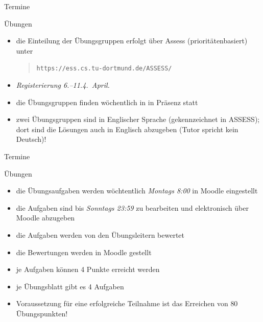 \documentclass[aspectratio=1610, 11pt]{beamer}
\begin{document}
%
%
%

\begin{frame}{Termine}
	\begin{exampleblock}{\"Ubungen}
		\begin{itemize}
			\item die Einteilung der \"Ubungsgruppen erfolgt \"uber Assess (priorit\"atenbasiert) unter
				\begin{quote}
\tt https://ess.cs.tu-dortmund.de/ASSESS/
				\end{quote}
			\item \emph{Registerierung 6.--11.4.~April.}
			\item die \"Ubungsgruppen finden w\"ochentlich in \alert{in Pr\"asenz} statt
			\item zwei \"Ubungsgruppen sind in \alert{Englischer Sprache} (gekennzeichnet in ASSESS); dort sind die L\"osungen auch in Englisch abzugeben (Tutor spricht kein Deutsch)!
		\end{itemize}
	\end{exampleblock}
\end{frame}

\begin{frame}{Termine}
	\begin{exampleblock}{\"Ubungen}
		\begin{itemize}
			\item die \"Ubungsaufgaben werden w\"ochtentlich \emph{Montags 8:00} in Moodle eingestellt
			\item die Aufgaben sind bis \emph{Sonntags 23:59} zu bearbeiten und elektronisch \"uber Moodle abzugeben
			\item die Aufgaben werden von den \"Ubungsleitern bewertet
			\item die Bewertungen werden in Moodle gestellt
			\item je Aufgaben k\"onnen 4 Punkte erreicht werden
			\item je \"Ubungsblatt gibt es 4 Aufgaben
			\item Voraussetzung f\"ur eine erfolgreiche Teilnahme ist das Erreichen von \alert{80 \"Ubungspunkten!}
		\end{itemize}
	\end{exampleblock}
\end{frame}
\end{document}
